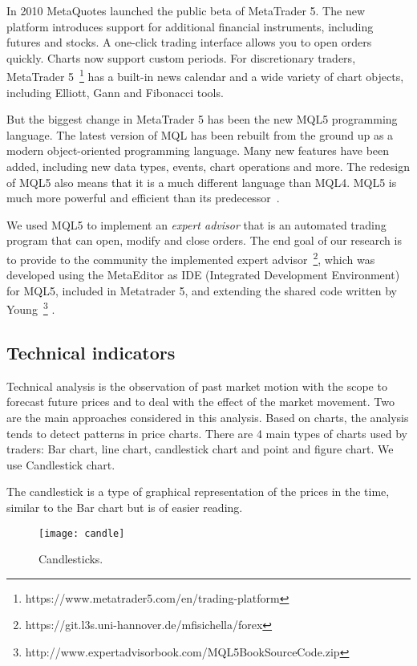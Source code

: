 In 2010 MetaQuotes launched the public beta of MetaTrader 5. The new platform introduces support for additional financial instruments, including futures and stocks. A one-click trading interface allows you to open orders quickly. Charts now support custom periods. For discretionary traders, MetaTrader 5~\footnote{https://www.metatrader5.com/en/trading-platform}  has a built-in news calendar and a wide variety of chart objects, including Elliott, Gann and Fibonacci tools.

But the biggest change in MetaTrader 5 has been the new MQL5 programming language. The latest version of MQL has been rebuilt from the ground up as a modern object-oriented programming language. Many new features have been added, including new data types, events, chart operations and more. The redesign of MQL5 also means that it is a much different language than MQL4. MQL5 is much more powerful and efficient than its predecessor~\cite{young13}. 

We used MQL5 to implement an \textit{expert advisor} that is an automated trading program that can open, modify and close orders. The end goal of our research is to provide to the community the implemented expert advisor~\footnote{https://git.l3s.uni-hannover.de/mfisichella/forex}, which was developed using the MetaEditor as IDE (Integrated Development Environment) for MQL5, included in Metatrader 5, and extending the shared code written by Young~\footnote{http://www.expertadvisorbook.com/MQL5BookSourceCode.zip} . 

\subsection{Technical indicators}
\label{sec:techInd}
Technical analysis is the observation of past market motion with the scope to forecast future prices and to deal with the effect of the market movement. Two are the main approaches considered in this analysis. Based on charts, the analysis tends to detect patterns in price charts. There are 4 main types of charts used by traders: Bar chart, line chart, candlestick chart and point and figure chart. We use Candlestick chart.

The candlestick is a type of graphical representation of the prices in the time, similar to the Bar chart but is of easier reading.

\begin{figure}[h]
\texttt{[image: candle]}
\centering
\caption{Candlesticks.}
\label{fig:candle} 
\end{figure}

